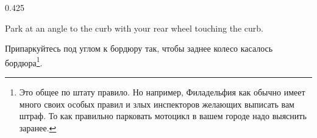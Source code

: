 

\begin{langblock}{0.425}
	\begin{eng}
	Park at an angle to the curb with your rear wheel touching the curb.
	\end{eng}
	\begin{rus}
		Припаркуйтесь под углом к бордюру так, чтобы заднее колесо касалось бордюра\footnote{Это общее по штату правило. Но например, Филадельфия как обычно имеет много своих особых правил и злых инспекторов желающих выписать вам штраф. То как правильно парковать мотоцикл в вашем городе надо выяснить заранее.}.
\end{rus}
\end{langblock}





































